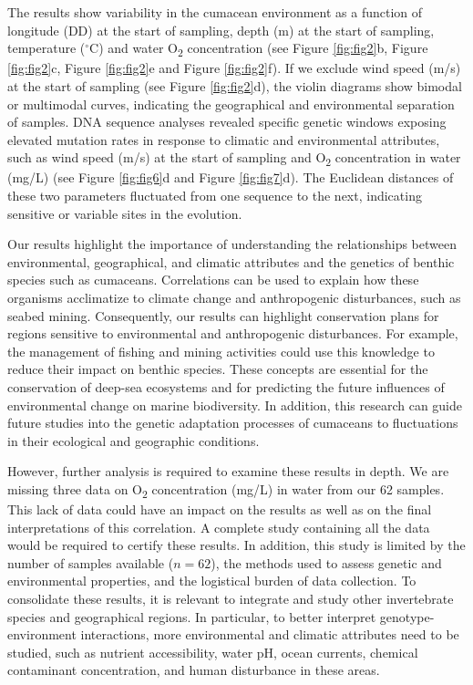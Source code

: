 The results show variability in the cumacean environment as a function of longitude (DD) at the start of sampling, depth (m) at the start of sampling, temperature ($^\circ$C) and water O\textsubscript{2} concentration (see Figure \ref{fig:fig2}b, Figure \ref{fig:fig2}c, Figure \ref{fig:fig2}e and Figure \ref{fig:fig2}f). If we exclude wind speed (m/s) at the start of sampling (see Figure \ref{fig:fig2}d), the violin diagrams show bimodal or multimodal curves, indicating the geographical and environmental separation of samples. DNA sequence analyses revealed specific genetic windows exposing elevated mutation rates in response to climatic and environmental attributes, such as wind speed (m/s) at the start of sampling and O\textsubscript{2} concentration in water (mg/L) (see Figure \ref{fig:fig6}d and Figure \ref{fig:fig7}d). The Euclidean distances of these two parameters fluctuated from one sequence to the next, indicating sensitive or variable sites in the evolution.

Our results highlight the importance of understanding the relationships between environmental, geographical, and climatic attributes and the genetics of benthic species such as cumaceans. Correlations can be used to explain how these organisms acclimatize to climate change and anthropogenic disturbances, such as seabed mining. Consequently, our results can highlight conservation plans for regions sensitive to environmental and anthropogenic disturbances. For example, the management of fishing and mining activities could use this knowledge to reduce their impact on benthic species. These concepts are essential for the conservation of deep-sea ecosystems and for predicting the future influences of environmental change on marine biodiversity. In addition, this research can guide future studies into the genetic adaptation processes of cumaceans to fluctuations in their ecological and geographic conditions.

However, further analysis is required to examine these results in depth. We are missing three data on O\textsubscript{2} concentration (mg/L) in water from our 62 samples. This lack of data could have an impact on the results as well as on the final interpretations of this correlation. A complete study containing all the data would be required to certify these results. In addition, this study is limited by the number of samples available ($n=62$), the methods used to assess genetic and environmental properties, and the logistical burden of data collection. To consolidate these results, it is relevant to integrate and study other invertebrate species and geographical regions. In particular, to better interpret genotype-environment interactions, more environmental and climatic attributes need to be studied, such as nutrient accessibility, water pH, ocean currents, chemical contaminant concentration, and human disturbance in these areas.

